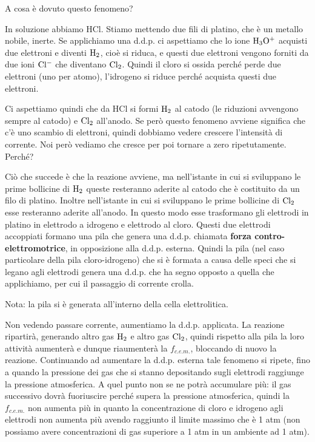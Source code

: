 \vspace{-0.5cm}A cosa è dovuto questo fenomeno?

In soluzione abbiamo HCl. Stiamo mettendo due fili di platino, che è un metallo nobile, inerte. Se applichiamo una d.d.p. ci aspettiamo che lo ione $\rm H_3O^+$ acquisti due elettroni e diventi $\rm H_2$, cioè si riduca, e questi due elettroni vengono forniti da due ioni $\rm Cl^-$ che diventano $\rm Cl_2$. Quindi il cloro si ossida perché perde due elettroni (uno per atomo), l'idrogeno si riduce perché acquista questi due elettroni.

Ci aspettiamo quindi che da HCl si formi $\rm H_2$ al catodo (le riduzioni avvengono sempre al catodo) e $\rm Cl_2$ all'anodo. Se però questo fenomeno avviene significa che c'è uno scambio di elettroni, quindi dobbiamo vedere crescere l'intensità di corrente. Noi però vediamo che cresce per poi tornare a zero ripetutamente. Perché?

Ciò che succede è che la reazione avviene, ma nell'istante in cui si sviluppano le prime bollicine di $\rm H_2$ queste resteranno aderite al catodo che è costituito da un filo di platino. Inoltre nell'istante in cui si sviluppano le prime bollicine di $\rm Cl_2$ esse resteranno aderite all'anodo. In questo modo esse trasformano gli elettrodi in platino in elettrodo a idrogeno e elettrodo al cloro. Questi due elettrodi accoppiati formano una pila che genera una d.d.p. chiamata \textbf{forza contro-elettromotrice}, in opposizione alla d.d.p. esterna. Quindi la pila (nel caso particolare della pila cloro-idrogeno) che si è formata a causa delle speci che si legano agli elettrodi genera una d.d.p. che ha segno opposto a quella che applichiamo, per cui il passaggio di corrente crolla.

Nota: la pila si è generata all'interno della cella elettrolitica.

Non vedendo passare corrente, aumentiamo la d.d.p. applicata. La reazione ripartirà, generando altro gas $\rm H_2$ e altro gas $\rm Cl_2$, quindi rispetto alla pila la loro attività aumenterà e dunque riaumenterà la $f_{c.e.m.}$, bloccando di nuovo la reazione. Continuando ad aumentare la d.d.p. esterna tale fenomeno si ripete, fino a quando la pressione dei gas che si stanno depositando sugli elettrodi raggiunge la pressione atmosferica. A quel punto non se ne potrà accumulare più: il gas successivo dovrà fuoriuscire perché supera la pressione atmosferica, quindi la $f_{c.e.m.}$ non aumenta più in quanto la concentrazione di cloro e idrogeno agli elettrodi non aumenta più avendo raggiunto il limite massimo che è 1 atm (non possiamo avere concentrazioni di gas superiore a 1 atm in un ambiente ad 1 atm). 

